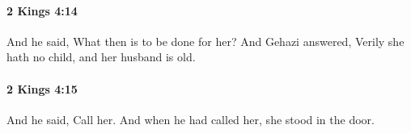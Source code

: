 		\paragraph{2 Kings 4:14} %
			\label{2KINGS-4-14}

			And he said, What then is to be done for her? And Gehazi answered, Verily she hath no child, and her husband is old.


		\paragraph{2 Kings 4:15} %
			\label{2KINGS-4-15}

			And he said, Call her. And when he had called her, she stood in the door.


